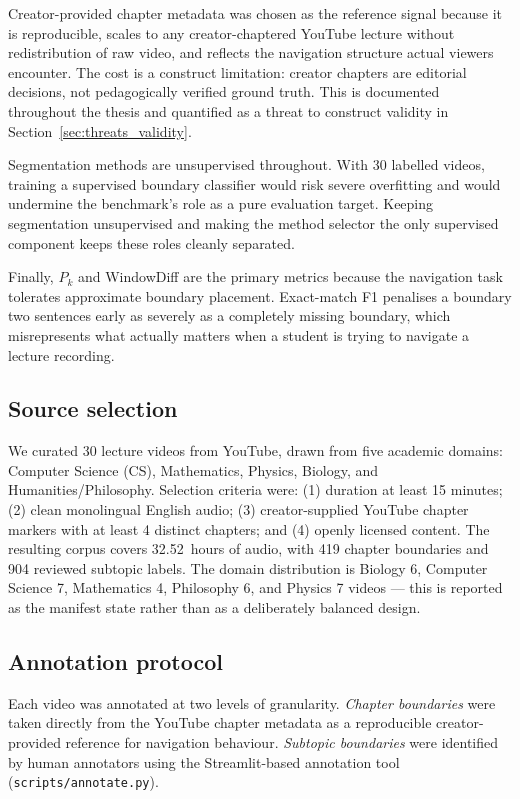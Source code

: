 Creator-provided chapter metadata was chosen as the reference signal because
it is reproducible, scales to any creator-chaptered YouTube lecture without
redistribution of raw video, and reflects the navigation structure actual
viewers encounter. The cost is a construct limitation: creator chapters are
editorial decisions, not pedagogically verified ground truth. This is documented
throughout the thesis and quantified as a threat to construct validity
in Section~\ref{sec:threats_validity}.

Segmentation methods are unsupervised throughout. With 30 labelled videos,
training a supervised boundary classifier would risk severe overfitting and
would undermine the benchmark's role as a pure evaluation target. Keeping
segmentation unsupervised and making the method selector the only supervised
component keeps these roles cleanly separated.

Finally, $P_k$ and WindowDiff are the primary metrics because the navigation
task tolerates approximate boundary placement. Exact-match F1 penalises a
boundary two sentences early as severely as a completely missing boundary,
which misrepresents what actually matters when a student is trying to navigate
a lecture recording.

\subsection{Source selection}

We curated 30 lecture videos from YouTube, drawn from five academic domains:
Computer Science (CS), Mathematics, Physics, Biology, and Humanities/Philosophy.
Selection criteria were: (1) duration at least 15 minutes; (2) clean monolingual
English audio; (3) creator-supplied YouTube chapter markers with at least 4
distinct chapters; and (4) openly licensed content.
The resulting corpus covers 32.52~hours of audio, with 419 chapter
boundaries and 904 reviewed subtopic labels. The domain distribution is
Biology 6, Computer Science 7, Mathematics 4, Philosophy 6, and Physics 7
videos --- this is reported as the manifest state rather than as a
deliberately balanced design.

\subsection{Annotation protocol}
\label{sec:annotation_protocol}

Each video was annotated at two levels of granularity.
\emph{Chapter boundaries} were taken directly from the YouTube chapter
metadata as a reproducible creator-provided reference for navigation behaviour.
\emph{Subtopic boundaries} were identified by human annotators using the
Streamlit-based annotation tool (\texttt{scripts/annotate.py}).

